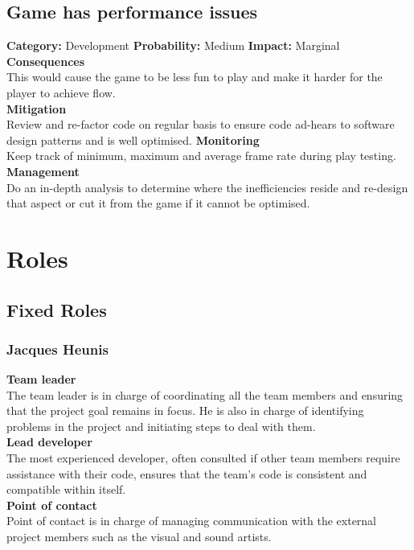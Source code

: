 \documentclass[a4paper,10pt]{article}
\begin{document}
\subsection{Game has performance issues}
\textbf{Category:} Development\newline
\textbf{Probability:} Medium\newline
\textbf{Impact:} Marginal
\\\textbf{Consequences}\\
This would cause the game to be less fun to play and make it harder for the player to achieve flow.
\smallskip\\\textbf{Mitigation}\\
Review and re-factor code on regular basis to ensure code ad-hears to software design patterns and is well optimised.
\smallskip\textbf{Monitoring}\\
Keep track of minimum, maximum and average frame rate during play testing.
\smallskip\\\textbf{Management}\\
Do an in-depth analysis to determine where the inefficiencies reside and re-design that aspect or cut it from the game if it cannot be optimised.

\section{Roles}
\subsection{Fixed Roles}
\subsubsection{Jacques Heunis}
\textbf{Team leader}\\
The team leader is in charge of coordinating all the team members and ensuring that the project goal remains in focus. He is also in charge of identifying problems in the project and initiating steps to deal with them.
\smallskip\\
\textbf{Lead developer}\\
The most experienced developer, often consulted if other team members require assistance with their code, ensures that the team's code is consistent and compatible within itself.
\smallskip\\
\textbf{Point of contact}\\
Point of contact is in charge of managing communication with the external project members such as the visual and sound artists.
\end{document}

